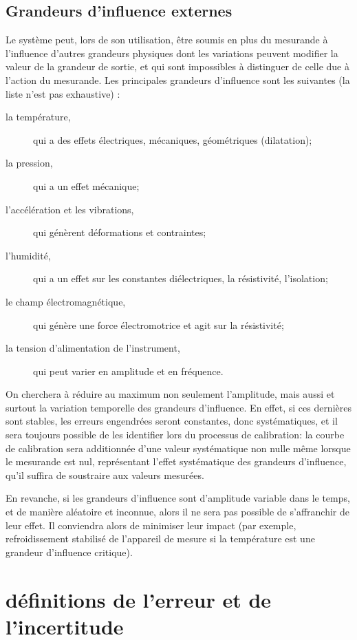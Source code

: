\subsection{Grandeurs d'influence externes}

Le système peut, lors de son utilisation, être soumis en plus du mesurande à l'influence d'autres grandeurs physiques dont les variations peuvent modifier la valeur de la grandeur de sortie, et qui sont impossibles à distinguer de celle due à l'action du mesurande. Les principales grandeurs d'influence sont les suivantes (la liste n'est pas exhaustive) :
\begin{description}
\item[la température,] qui a des effets électriques, mécaniques, géométriques (dilatation);
\item[la pression,] qui a un effet mécanique;
\item[l'accélération et les vibrations,] qui génèrent déformations et contraintes;
\item[l'humidité,] qui a un effet sur les constantes diélectriques, la résistivité, l'isolation;
\item[le champ électromagnétique,] qui génère une force électromotrice et agit sur la résistivité;
\item[la tension d'alimentation de l'instrument,] qui peut varier en amplitude et en fréquence.
\end{description}
On cherchera à réduire au maximum non seulement l'amplitude, mais aussi et surtout la variation temporelle des grandeurs d'influence. En effet, si ces dernières sont stables, les erreurs engendrées seront constantes, donc systématiques, et il sera toujours possible de les identifier lors du processus de calibration: la courbe de calibration sera additionnée d'une valeur systématique non nulle même lorsque le mesurande est nul, représentant l'effet systématique des grandeurs d'influence, qu'il suffira de soustraire aux valeurs mesurées.

En revanche, si les grandeurs d'influence sont d'amplitude variable dans le temps, et de manière aléatoire et inconnue, alors il ne sera pas possible de s'affranchir de leur effet. Il conviendra alors de minimiser leur impact (par exemple, refroidissement stabilisé de l'appareil de mesure si la température est une grandeur d'influence critique).

\section{définitions de l'erreur et de l'incertitude}

